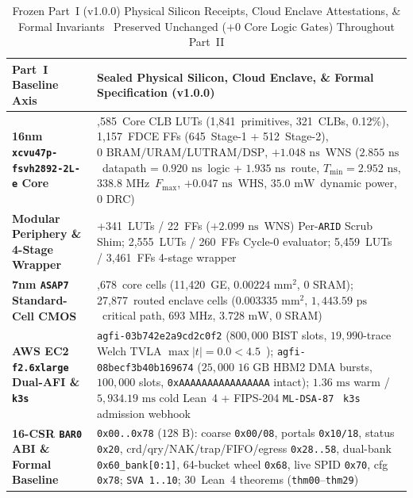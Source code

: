 \documentclass[10pt,twocolumn]{article}
\providecommand{\BaselineVersion}{v1.0.0}
\providecommand{\LeanPartOneTotal}{30}
\providecommand{\CoreClbLuts}{1,585}
\providecommand{\CoreLogicalPrimitives}{1,841}
\providecommand{\CoreClbSites}{321}
\providecommand{\CoreUtilPct}{0.12\%}
\providecommand{\CoreFfs}{1,157}
\providecommand{\CoreStageOneFfs}{645}
\providecommand{\CoreStageTwoFfs}{512}
\providecommand{\ScrubShimLuts}{341}
\providecommand{\ScrubShimFfs}{22}
\providecommand{\ScrubShimWns}{\ensuremath{+2.099\text{~ns}}}
\providecommand{\CycleZeroLuts}{2,555}
\providecommand{\CycleZeroFfs}{260}
\providecommand{\WrapperLuts}{5,459}
\providecommand{\WrapperFfs}{3,461}
\providecommand{\CoreWns}{\ensuremath{+1.048\text{~ns}}}
\providecommand{\CoreWhs}{\ensuremath{+0.047\text{~ns}}}
\providecommand{\StageTwoNs}{\ensuremath{2.855\text{~ns}}}
\providecommand{\StageTwoLogicNs}{\ensuremath{0.920\text{~ns}}}
\providecommand{\StageTwoRouteNs}{\ensuremath{1.935\text{~ns}}}
\providecommand{\CoreTminNs}{\ensuremath{2.952\text{~ns}}}
\providecommand{\CoreFmax}{\ensuremath{338.8\text{~MHz}}}
\providecommand{\CorePowerMw}{\ensuremath{35.0\text{~mW}}}
\providecommand{\AwsAgfiId}{agfi-03b742e2a9cd2c0f2}
\providecommand{\AwsHbmAgfiId}{agfi-08becf3b40b169674}
\providecommand{\AsicCoreCells}{9,678}
\providecommand{\AsicCoreGe}{11,420}
\providecommand{\AsicCoreAreaMm}{\ensuremath{0.00224\text{~mm}^2}}
\providecommand{\AsicStandardCells}{27,877}
\providecommand{\AsicEnclaveAreaMm}{\ensuremath{0.003335\text{~mm}^2}}
\providecommand{\AsicStageOneTwoDelayPs}{\ensuremath{1,443.59\text{~ps}}}
\providecommand{\AsicFmaxMhz}{\ensuremath{693\text{~MHz}}}
\providecommand{\AsicTotalPowerMw}{\ensuremath{3.728\text{~mW}}}
\theoremstyle{spectralthm}
\begin{document}
\begin{table}[!tp]
\centering
\footnotesize
\setlength{\tabcolsep}{5.2pt}
\renewcommand{\arraystretch}{1.18}
\caption{Frozen Part~I (\BaselineVersion) Physical Silicon Receipts, Cloud Enclave Attestations, \& Formal Invariants~\cite{murphy2026part1} Preserved Unchanged ($+0$ Core Logic Gates) Throughout Part~II}
\label{tab:v100_baseline}
\begin{tabularx}{\textwidth}{@{}>{\raggedright\arraybackslash}p{3.55cm} >{\raggedright\arraybackslash}X@{}}
\toprule
\textbf{Part~I Baseline Axis} & \textbf{Sealed Physical Silicon, Cloud Enclave, \& Formal Specification (\BaselineVersion)} \\
\midrule
\textbf{16nm \texttt{xcvu47p-fsvh2892-2L-e} Core} & \CoreClbLuts\ Core CLB LUTs (\CoreLogicalPrimitives\ primitives, \CoreClbSites\ CLBs, \CoreUtilPct), \CoreFfs\ FDCE FFs (\CoreStageOneFfs\ Stage-1 + \CoreStageTwoFfs\ Stage-2), $0\text{~BRAM/URAM/LUTRAM/DSP}$, \CoreWns\ WNS (\StageTwoNs\ datapath = \StageTwoLogicNs\ logic + \StageTwoRouteNs\ route, $T_{\min}=\CoreTminNs$, \CoreFmax\ $F_{\max}$, \CoreWhs\ WHS, \CorePowerMw\ dynamic power, $0$ DRC) \\
\textbf{Modular Periphery \& 4-Stage Wrapper} & +\ScrubShimLuts\ LUTs / \ScrubShimFfs\ FFs (\ScrubShimWns\ WNS) Per-\texttt{ARID} Scrub Shim; \CycleZeroLuts\ LUTs / \CycleZeroFfs\ FFs Cycle-0 evaluator; \WrapperLuts\ LUTs / \WrapperFfs\ FFs 4-stage wrapper \\
\textbf{7nm \texttt{ASAP7} Standard-Cell CMOS~\cite{clark2016asap7}} & \AsicCoreCells\ core cells (\AsicCoreGe\ GE, \AsicCoreAreaMm, $0$ SRAM); \AsicStandardCells\ routed enclave cells (\AsicEnclaveAreaMm, \AsicStageOneTwoDelayPs\ critical path, \AsicFmaxMhz, \AsicTotalPowerMw, $0$ SRAM) \\
\textbf{AWS EC2 \texttt{f2.6xlarge} Dual-AFI \& \texttt{k3s}} & \texttt{\AwsAgfiId} ($800,000$ BIST slots, $19,990$-trace Welch TVLA $\max|t|=0.0 < 4.5$~\cite{gross2016dom}); \texttt{\AwsHbmAgfiId} ($25,000$ $16\text{~GB}$ HBM2 DMA bursts, $100,000$ slots, \texttt{0xAAAAAAAAAAAAAAAA} intact); $1.36\text{~ms}$ warm / $5,934.19\text{~ms}$ cold Lean~4 + FIPS-204 \texttt{ML-DSA-87}~\cite{fips204mldsa} \texttt{k3s} admission webhook \\
\textbf{16-CSR \texttt{BAR0} ABI \& Formal Baseline} & \texttt{0x00..0x78} ($128\text{~B}$): coarse \texttt{0x00/08}, portals \texttt{0x10/18}, status \texttt{0x20}, crd/qry/NAK/trap/FIFO/egress \texttt{0x28..58}, dual-bank \texttt{0x60\_bank[0:1]}, 64-bucket wheel \texttt{0x68}, live SPID \texttt{0x70}, cfg \texttt{0x78}; \texttt{SVA 1..10}; \LeanPartOneTotal\ Lean~4 theorems (\texttt{thm00}--\texttt{thm29}) \\
\bottomrule
\end{tabularx}
\end{table}
\end{document}
